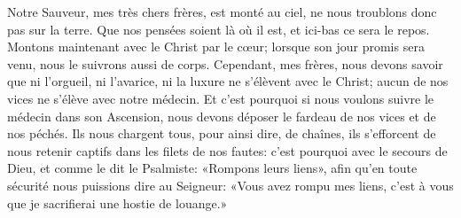 Notre Sauveur, mes très chers frères, est monté au ciel,
	ne nous troublons donc pas sur la terre.
Que nos pensées soient là où il est,
	et ici-bas ce sera le repos.
Montons maintenant avec le Christ par le cœur;
	lorsque son jour promis sera venu, nous le suivrons aussi de corps.
Cependant, mes frères, nous devons savoir
	que ni l’orgueil, ni l’avarice, ni la luxure ne s’élèvent avec le Christ;
	aucun de nos vices ne s’élève avec notre médecin.
Et c’est pourquoi si nous voulons suivre le médecin dans son Ascension,
	nous devons déposer le fardeau de nos vices et de nos péchés.
Ils nous chargent tous, pour ainsi dire, de chaînes,
	ils s’efforcent de nous retenir captifs dans les filets de nos fautes:
	c’est pourquoi avec le secours de Dieu, et comme le dit le Psalmiste:
	«Rompons leurs liens»,
	afin qu’en toute sécurité nous puissions dire au Seigneur:
	«Vous avez rompu mes liens,
	c’est à vous que je sacrifierai une hostie de louange.»

